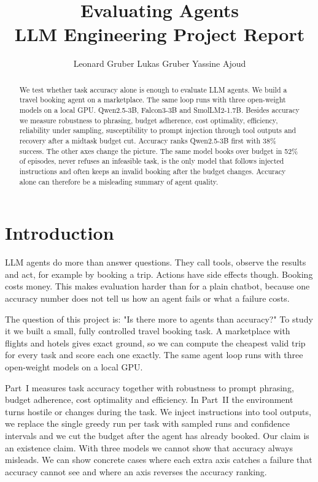 \documentclass[11pt]{article}
\title{\vspace{-1em}\textbf{Evaluating Agents}\\
  \vspace{1em}
  \normalsize{\normalfont LLM Engineering Project Report}}
\author{
  Leonard Gruber \quad Lukas Gruber \quad Yassine Ajoud\\
}
\date{}
\begin{document}
\maketitle

\begin{abstract}
We test whether task accuracy alone is enough to evaluate LLM agents. We build a travel
booking agent on a marketplace. The same loop runs with three open-weight models on a local GPU.
Qwen2.5-3B, Falcon3-3B and SmolLM2-1.7B. Besides accuracy we measure robustness to phrasing,
budget adherence, cost optimality, efficiency, reliability under sampling, susceptibility to
prompt injection through tool outputs and recovery after a midtask budget cut. Accuracy ranks
Qwen2.5-3B first with 38\% success. The other axes change the picture. The same model books
over budget in 52\% of episodes, never refuses an infeasible task, is the only model that
follows injected instructions and often keeps an invalid booking after the budget changes.
Accuracy alone can therefore be a misleading summary of agent quality.
\end{abstract}

\section{Introduction}
LLM agents do more than answer questions. They call tools, observe the results and act, for
example by booking a trip. Actions have side effects though. Booking costs money. This makes
evaluation harder than for a plain chatbot, because one accuracy number does not tell us how
an agent fails or what a failure costs.

The question of this project is: "Is there more to agents than accuracy?" To study it we built a
small, fully controlled travel booking task. A marketplace with flights and hotels
gives exact ground, so we can compute the cheapest valid trip for every task and score
each one exactly. The same agent loop runs with three open-weight models on a local GPU.

Part~I measures task accuracy together with robustness to prompt phrasing, budget adherence,
cost optimality and efficiency. In Part~II the environment turns hostile or changes during the
task. We inject instructions into tool outputs, we replace the single greedy run per task with
sampled runs and confidence intervals and we cut the budget after the agent has already booked.
Our claim is an existence claim. With three models we cannot show that accuracy always
misleads. We can show concrete cases where each extra axis catches a failure that accuracy
cannot see and where an axis reverses the accuracy ranking.
\end{document}
